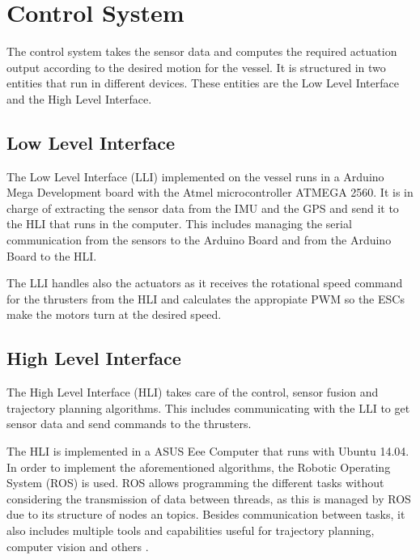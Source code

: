\section{Control System}\label{sec:ControlComputation}
The control system takes the sensor data and computes the required actuation output according to the desired motion for the vessel. It is structured in two entities that run in different devices. These entities are the Low Level Interface and the High Level Interface.

\subsection{Low Level Interface} 

The Low Level Interface (LLI) implemented on the vessel runs in a Arduino Mega Development board with the Atmel microcontroller ATMEGA 2560. It is in charge of extracting the sensor data from the IMU and the GPS and send it to the HLI that runs in the computer. This includes managing the serial communication from the sensors to the Arduino Board and from the Arduino Board to the HLI. 

The LLI handles also the actuators as it receives the rotational speed command for the thrusters from the HLI and calculates the appropiate PWM so the ESCs make the motors turn at the desired speed.

\subsection{High Level Interface}

The High Level Interface (HLI) takes care of the control, sensor fusion and trajectory planning algorithms. This includes communicating with the LLI to get sensor data and send commands to the thrusters. 

The HLI is implemented in a ASUS Eee Computer \cite{asus} that runs with Ubuntu 14.04. In order to implement the aforementioned algorithms, the Robotic Operating System (ROS) is used. ROS allows programming the different tasks without considering the transmission of data between threads, as this is managed by ROS due to its structure of nodes an topics. Besides communication between tasks, it also includes multiple tools and capabilities useful for trajectory planning, computer vision and others \cite{ROS}.